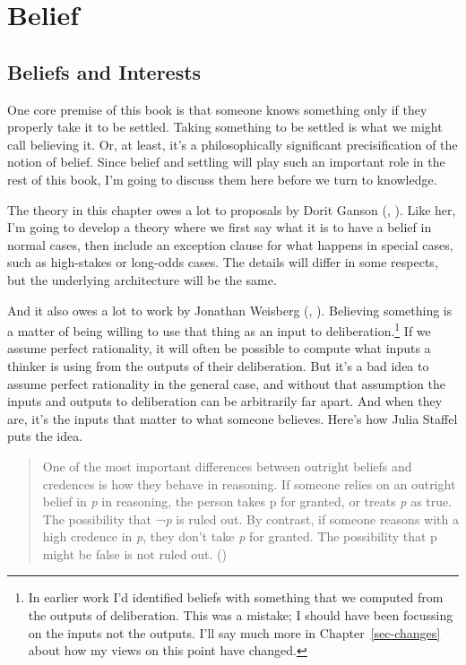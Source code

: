 \documentclass[
  10pt,
  letterpaper,
  twoside]{scrbook}
\begin{document}

\chapter{Belief}\label{sec-belief}

\section{Beliefs and Interests}\label{sec-beliefsinterests}

One core premise of this book is that someone knows something only if
they properly take it to be settled. Taking something to be settled is
what we might call believing it. Or, at least, it's a philosophically
significant precisification of the notion of belief. Since belief and
settling will play such an important role in the rest of this book, I'm
going to discuss them here before we turn to knowledge.

The theory in this chapter owes a lot to proposals by Dorit Ganson
(, ). Like
her, I'm going to develop a theory where we first say what it is to have
a belief in normal cases, then include an exception clause for what
happens in special cases, such as high-stakes or long-odds cases. The
details will differ in some respects, but the underlying architecture
will be the same.

And it also owes a lot to work by Jonathan Weisberg
(, ).
Believing something is a matter of being willing to use that thing as an
input to deliberation.\footnote{In earlier work I'd identified beliefs
  with something that we computed from the outputs of deliberation. This
  was a mistake; I should have been focussing on the inputs not the
  outputs. I'll say much more in Chapter~\ref{sec-changes} about how my
  views on this point have changed.} If we assume perfect rationality,
it will often be possible to compute what inputs a thinker is using from
the outputs of their deliberation. But it's a bad idea to assume perfect
rationality in the general case, and without that assumption the inputs
and outputs to deliberation can be arbitrarily far apart. And when they
are, it's the inputs that matter to what someone believes. Here's how
Julia Staffel puts the idea.

\begin{quote}
One of the most important differences between outright beliefs and
credences is how they behave in reasoning. If someone relies on an
outright belief in \emph{p} in reasoning, the person takes p for
granted, or treats \emph{p} as true. The possibility that ¬\emph{p} is
ruled out. By contrast, if someone reasons with a high credence in
\emph{p}, they don't take \emph{p} for granted. The possibility that p
might be false is not ruled out. ()
\end{quote}
\end{document}

